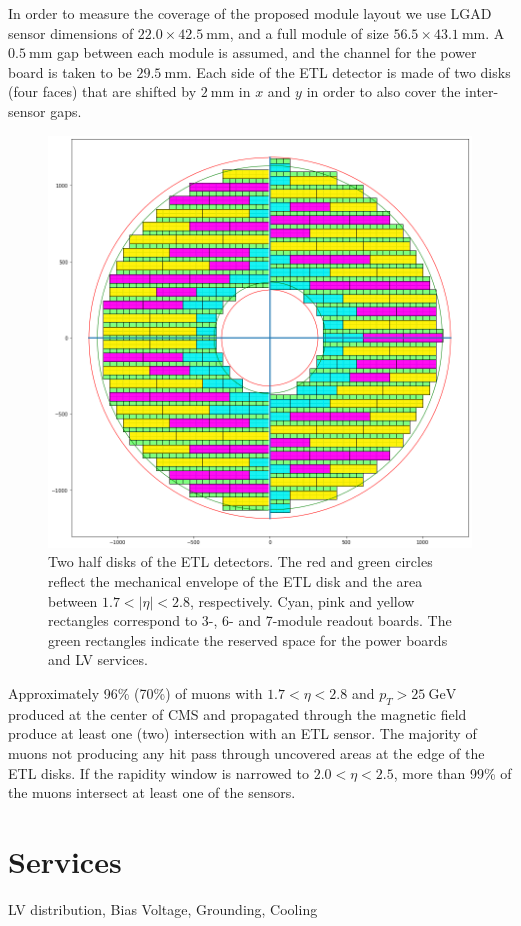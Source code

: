\documentclass[11pt]{article}
\begin{document}
In order to measure the coverage of the proposed module layout we use LGAD sensor dimensions of $22.0 \times 42.5~\mathrm{mm}$, and a full module of size $56.5 \times 43.1~\mathrm{mm}$.
A $0.5~\mathrm{mm}$ gap between each module is assumed, and the channel for the power board is taken to be $29.5~\mathrm{mm}$.
Each side of the ETL detector is made of two disks (four faces) that are shifted by $2~\mathrm{mm}$ in $x$ and $y$ in order to also cover the inter-sensor gaps.

\begin{figure}[!h]
\centering
\includegraphics[width=0.60 \textwidth]{figures/coverage_both.png}
\caption{
Two half disks of the ETL detectors.
The red and green circles reflect the mechanical envelope of the ETL disk and the area between $1.7<|\eta|<2.8$, respectively.
Cyan, pink and yellow rectangles correspond to 3-, 6- and 7-module readout boards.
The green rectangles indicate the reserved space for the power boards and LV services.
}
\label{fig:coverage_both}
\end{figure}

Approximately 96\% (70\%) of muons with $1.7<\eta<2.8$ and $p_{T}>25~\mathrm{GeV}$ produced at the center of CMS and propagated through the magnetic field produce at least one (two) intersection with an ETL sensor.
The majority of muons not producing any hit pass through uncovered areas at the edge of the ETL disks.
If the rapidity window is narrowed to $2.0<\eta<2.5$, more than 99\% of the muons intersect at least one of the sensors.

\section{Services}

LV distribution, Bias Voltage, Grounding, Cooling
\end{document}
